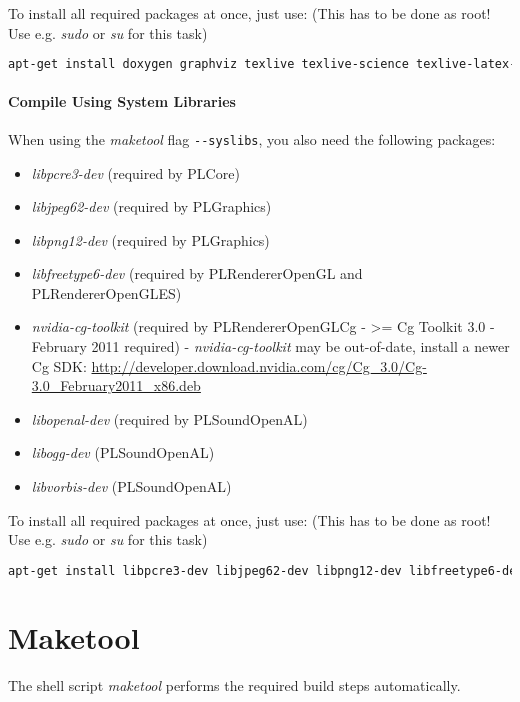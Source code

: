 To install all required packages at once, just use: (This has to be done as root! Use e.g. \emph{sudo} or \emph{su} for this task)
\begin{lstlisting}[language=sh]
apt-get install doxygen graphviz texlive texlive-science texlive-latex-extra texlive-latexextra texlive-latex3 dvipdfm dvipdfmx
\end{lstlisting}


\paragraph{Compile Using System Libraries}
When using the \emph{maketool} flag \verb+--syslibs+, you also need the following packages:
\begin{itemize}
\item{\emph{libpcre3-dev} (required by PLCore)}
\item{\emph{libjpeg62-dev} (required by PLGraphics)}
\item{\emph{libpng12-dev} (required by PLGraphics)}
\item{\emph{libfreetype6-dev} (required by PLRendererOpenGL and PLRendererOpenGLES)}
\item{\emph{nvidia-cg-toolkit} (required by PLRendererOpenGLCg - >= Cg Toolkit 3.0 - February 2011 required) - \emph{nvidia-cg-toolkit} may be out-of-date, install a newer Cg \ac{SDK}: \url{http://developer.download.nvidia.com/cg/Cg_3.0/Cg-3.0_February2011_x86.deb}}
\item{\emph{libopenal-dev} (required by PLSoundOpenAL)}
\item{\emph{libogg-dev} (PLSoundOpenAL)}
\item{\emph{libvorbis-dev} (PLSoundOpenAL)}
\end{itemize}

To install all required packages at once, just use: (This has to be done as root! Use e.g. \emph{sudo} or \emph{su} for this task)
\begin{lstlisting}[language=sh]
apt-get install libpcre3-dev libjpeg62-dev libpng12-dev libfreetype6-dev libopenal-dev libogg-dev libvorbis-dev
\end{lstlisting}




\section{Maketool}
The shell script \emph{maketool} performs the required build steps automatically.

